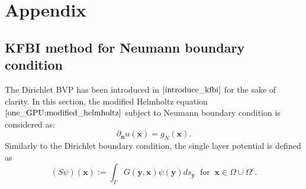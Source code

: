 
\section{Appendix}
\subsection{KFBI method for Neumann boundary condition}\label{appen::neumann::condition}
The Dirichlet BVP has been introduced in $\ref{introduce_kfbi}$ for the sake of clarity. In this section, the modified Helmholtz equation $\eqref{one_GPU:modified_helmholtz}$ subject to Neumann boundary condition is considered as:
\begin{equation}
    \partial_{\mathbf{n}}u(\mathbf{x}) = g_{N}(\mathbf{x}). \label{Neumann}
\end{equation}
Similarly to the Dirichlet boundary condition, the single layer potential is defined as
\begin{equation}
    (S\psi)(\mathbf{x}) := \int_{\Gamma} G(\mathbf{y}, \mathbf{x}) \psi(\mathbf{y}) d s_{\mathbf{y}} ~\text { for } ~\mathbf{x} \in \Omega \cup \Omega^{c}. \label{single}
\end{equation}

